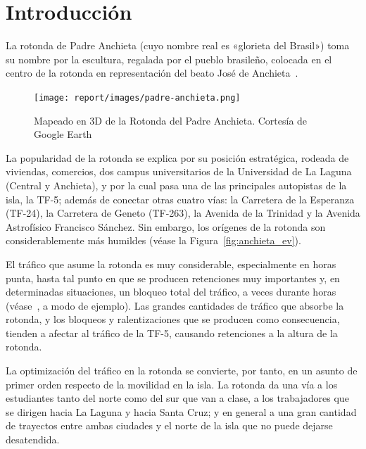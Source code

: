 \chapter{Introducción}
\label{cap:intro}

La rotonda de Padre Anchieta (cuyo nombre real es «glorieta del Brasil») toma su nombre por la escultura, regalada por el pueblo brasileño, colocada en el centro de la rotonda en representación del beato José de Anchieta~\cite{gallo_glorieta_2013}.

\begin{figure}[H]
    \centering
    \texttt{[image: report/images/padre-anchieta.png]}
    \caption[Mapeado en 3D de la Rotonda del Padre Anchieta.]{Mapeado en 3D de la Rotonda del Padre Anchieta. Cortesía de Google Earth\protect\footnotemark}
    \label{fig:padre_anchieta_3d}
\end{figure}


La popularidad de la rotonda se explica por su posición estratégica, rodeada de viviendas, comercios, dos campus universitarios de la Universidad de La Laguna (Central y Anchieta), y por la cual pasa una de las principales autopistas de la isla, la TF-5; además de conectar otras cuatro vías: la Carretera de la Esperanza (TF-24), la Carretera de Geneto (TF-263), la Avenida de la Trinidad y la Avenida Astrofísico Francisco Sánchez. Sin embargo, los orígenes de la rotonda son considerablemente más humildes (véase la Figura~\ref{fig:anchieta_ev}).

El tráfico que asume la rotonda es muy considerable, especialmente en horas punta, hasta tal punto en que se producen retenciones muy importantes y, en determinadas situaciones, un bloqueo total del tráfico, a veces durante horas (véase~\cite{gulesserian_vuelven_2018}, a modo de ejemplo). Las grandes cantidades de tráfico que absorbe la rotonda, y los bloqueos y ralentizaciones que se producen como consecuencia, tienden a afectar al tráfico de la TF-5, causando retenciones a la altura de la rotonda.

La optimización del tráfico en la rotonda se convierte, por tanto, en un asunto de primer orden respecto de la movilidad en la isla. La rotonda da una vía a los estudiantes tanto del norte como del sur que van a clase, a los trabajadores que se dirigen hacia La Laguna y hacia Santa Cruz; y en general a una gran cantidad de trayectos entre ambas ciudades y el norte de la isla que no puede dejarse desatendida.

